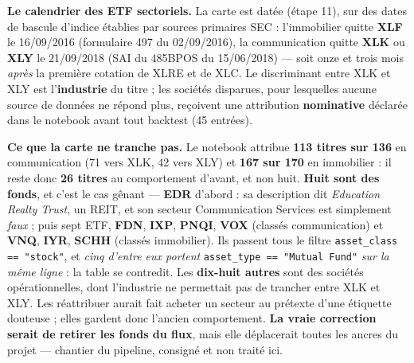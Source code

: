 \documentclass[9pt,a4paper]{extarticle}
\begin{document}
{\vspace{0.5mm}
\textbf{Le calendrier des ETF sectoriels.} La carte est datée (étape 11), sur des dates de bascule d'indice
établies par sources primaires SEC : l'immobilier quitte \textbf{XLF} le 16/09/2016 (formulaire 497 du
02/09/2016), la communication quitte \textbf{XLK} ou \textbf{XLY} le 21/09/2018 (SAI du 485BPOS du 15/06/2018)
--- soit onze et trois mois \emph{après} la première cotation de XLRE et de XLC. Le discriminant entre XLK et
XLY est l'\textbf{industrie} du titre ; les sociétés disparues, pour lesquelles aucune source de données ne
répond plus, reçoivent une attribution \textbf{nominative} déclarée dans le notebook avant tout backtest
(45 entrées).\par
\vspace{0.4mm}
\textbf{Ce que la carte ne tranche pas.} Le notebook attribue \textbf{113 titres sur 136} en communication
(71 vers XLK, 42 vers XLY) et \textbf{167 sur 170} en immobilier : il reste donc \textbf{26 titres} au
comportement d'avant, et non huit. \textbf{Huit sont des fonds}, et c'est le cas gênant --- \textbf{EDR}
d'abord : sa description dit \og{}\emph{Education Realty Trust}\fg{}, un REIT, et son secteur Communication
Services est simplement \emph{faux} ; puis sept ETF, \textbf{FDN}, \textbf{IXP}, \textbf{PNQI}, \textbf{VOX}
(classés communication) et \textbf{VNQ}, \textbf{IYR}, \textbf{SCHH} (classés immobilier). Ils passent tous
le filtre \texttt{asset\_class == "stock"}, et \emph{cinq d'entre eux portent} \texttt{asset\_type == "Mutual
Fund"} \emph{sur la même ligne} : la table se contredit. Les \textbf{dix-huit autres} sont des sociétés
opérationnelles, dont l'industrie ne permettait pas de trancher entre XLK et XLY.
Les réattribuer aurait fait acheter un secteur au prétexte d'une étiquette douteuse ; elles gardent donc
l'ancien comportement. \textbf{La vraie correction serait de retirer les fonds du flux}, mais elle
déplacerait toutes les ancres du projet --- chantier du pipeline, consigné et non traité ici.\par}
\end{document}
